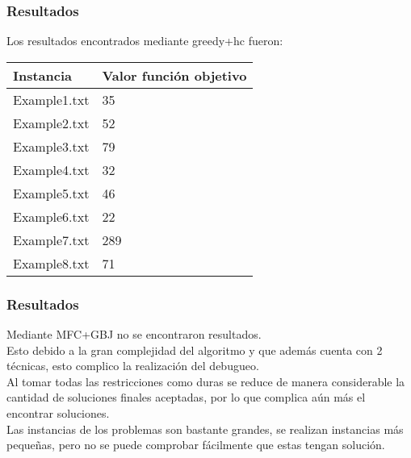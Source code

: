 \frame
{
\frametitle{Resultados}
Los resultados encontrados mediante greedy+hc fueron:
\begin{center}
	\begin{tabular}{|l|l|}
	        \hline
	        Instancia       & Valor función objetivo        \\
	        \hline
	        Example1.txt    & 35                            \\
	        Example2.txt    & 52                            \\
	        Example3.txt    & 79                            \\
	        Example4.txt    & 32                            \\
	        Example5.txt    & 46                            \\
	        Example6.txt    & 22                            \\
	        Example7.txt    & 289                           \\
	        Example8.txt    & 71                            \\
	        \hline
	\end{tabular}
\end{center}
}
\frame
{
\frametitle{Resultados}
Mediante MFC+GBJ no se encontraron resultados.\\\vspace{14 pt}
Esto debido a la gran complejidad del algoritmo y que además cuenta con 2 técnicas,  esto complico la realización del debugueo.\\\vspace{14 pt}
Al tomar todas las restricciones como duras se reduce de manera considerable la cantidad de soluciones finales aceptadas, por lo
que complica aún más el encontrar soluciones.\\\vspace{14 pt}
Las instancias de los problemas son bastante grandes, se realizan instancias más pequeñas, pero no se puede comprobar fácilmente que estas tengan solución.\\

}
